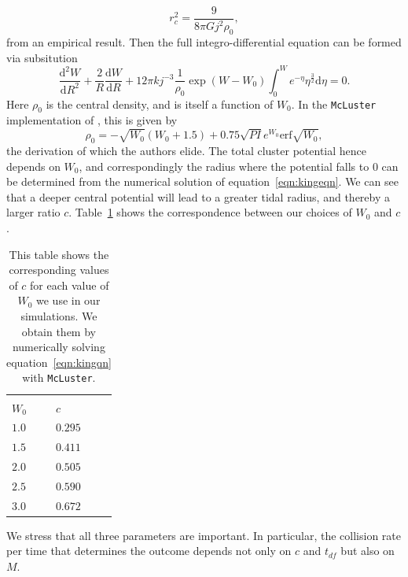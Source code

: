 \documentclass{princeton_astro_thesis}
\numberwithin{equation}{section}
\begin{document}
\begin{equation}
r_{c}^{2} = \frac{9}{8 \pi G j^2 \rho_0},
\end{equation}
from an empirical result. Then the full integro-differential equation can be formed via subsitution
\begin{equation}
\frac{\mathrm{d}^2W}{\mathrm{d}R^2} + \frac{2}{R}\frac{\mathrm{d}W}{\mathrm{d}R} + 12 \pi k j^{-3} \frac{1}{\rho_{0}} \exp(W-W_{0}) \int_{0}^{W} e^{-\eta} \eta^\frac{3}{2} \mathrm{d}\eta = 0.
\label{eqn:kingeqn}
\end{equation}
Here $\rho_{0}$ is the central density, and is itself a function of $W_{0}$.  In the \texttt{McLuster} implementation of \citet{2011Kupper}, this is given by
\begin{equation}
\rho_{0} = -\sqrt{W_{0}}(W_{0}+1.5) + 0.75\sqrt{PI} e^{W_{0}} \mathrm{erf}{\sqrt{W_{0}}},
\end{equation}
the derivation of which the authors elide. The total cluster potential hence depends on $W_{0}$, and correspondingly the radius where the potential falls to $0$ can be determined from the numerical solution of equation~\ref{eqn:kingeqn}.  We can see that a deeper central potential will lead to a greater tidal radius, and thereby a larger ratio $c$. Table~\ref{tbl:ctable} shows the correspondence between our choices of $W_{0}$ and $c$.

\begin{table}
\begin{center}
\begin{tabular}{l l}
\hline \hline \\
$W_{0}$ & $c$ \\
$1.0$ & $0.295$ \\
$1.5$ & $0.411$ \\
$2.0$ & $0.505$ \\
$2.5$ & $0.590$ \\
$3.0$ & $0.672$
\end{tabular}
\end{center}
\caption{This table shows the corresponding values of $c$ for each value of $W_{0}$ we use in our simulations. We obtain them by numerically solving equation~\ref{eqn:kingqn} with \texttt{McLuster}.}
\label{tbl:ctable}
\end{table}

We stress that all three parameters are important. In particular,
the collision rate per time that determines the outcome 
depends not only on $c$ and $t_{df}$ but also on $M$.
\end{document}
